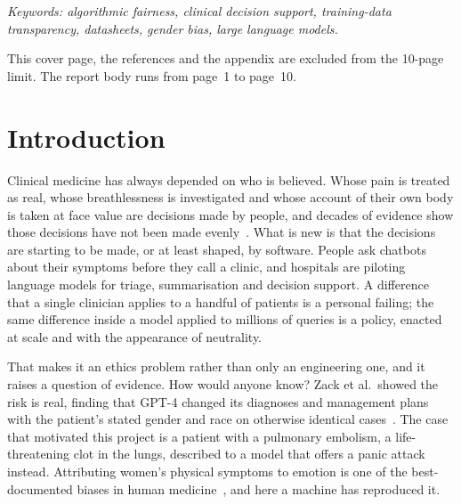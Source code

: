 \documentclass[11pt,twocolumn]{article}
\begin{document}
\begin{titlepage}
\vfill
\vspace{0.7cm}
{\footnotesize\itshape Keywords: algorithmic fairness, clinical decision support,
training-data transparency, datasheets, gender bias, large language models.\par}
\vspace{0.5cm}
{\footnotesize This cover page, the references and the appendix are excluded from
the 10-page limit. The report body runs from page~1 to page~10.\par}
\end{titlepage}

\twocolumn
{}
\setcounter{page}{1}

\section{Introduction}

Clinical medicine has always depended on who is believed. Whose pain is treated
as real, whose breathlessness is investigated and whose account of their own body
is taken at face value are decisions made by people, and decades of evidence show
those decisions have not been made evenly~\cite{r18,r19,r20}. What is new is that
the decisions are starting to be made, or at least shaped, by software. People
ask chatbots about their symptoms before they call a clinic, and hospitals are
piloting language models for triage, summarisation and decision support. A
difference that a single clinician applies to a handful of patients is a personal
failing; the same difference inside a model applied to millions of queries is a
policy, enacted at scale and with the appearance of neutrality.

That makes it an ethics problem rather than only an engineering one, and it
raises a question of evidence. How would anyone know? Zack et al.\ showed the
risk is real, finding that GPT-4 changed its diagnoses and management plans with
the patient's stated gender and race on otherwise identical cases~\cite{r12}.
The case that motivated this project is a patient with a pulmonary embolism, a
life-threatening clot in the lungs, described to a model that offers a panic
attack instead. Attributing women's physical symptoms to emotion is one of the
best-documented biases in human medicine~\cite{r18,r20}, and here a machine has
reproduced it.
\end{document}
